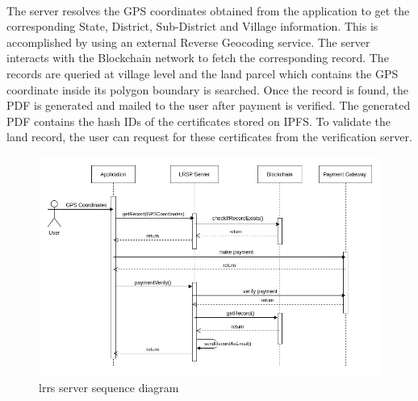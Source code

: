 \documentclass{article}
\begin{document}
        \paragraph{}
        The server resolves the GPS coordinates obtained from the application to get the corresponding State, District, Sub-District and Village information. This is accomplished by using an external Reverse Geocoding service. The server interacts with the Blockchain network to fetch the corresponding record. The records are queried at village level and the land parcel which contains the GPS coordinate inside its polygon boundary is searched. Once the record is found, the PDF is generated and mailed to the user after payment is verified. The generated PDF contains the hash IDs of the certificates stored on IPFS. To validate the land record, the user can request for these certificates from the verification server.
        \begin{figure}[H]
                \includegraphics[scale=0.5]{lrsp_seq.png}
                \centering
                \caption{\gls{lrrs} server sequence diagram}
        \end{figure}
        
\end{document}
